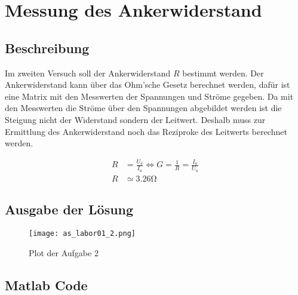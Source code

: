 \section{Messung des Ankerwiderstand}

\subsection{Beschreibung}

Im zweiten Versuch soll der Ankerwiderstand $R$ bestimmt werden.
Der Ankerwiderstand kann über das Ohm'sche Gesetz berechnet werden,
dafür ist eine Matrix mit den Messwerten der Spannungen und Ströme gegeben.
Da mit den Messwerten die Ströme über den Spannungen abgebildet werden ist die
Steigung nicht der Widerstand sondern der Leitwert. Deshalb muss zur Ermittlung
des Ankerwiderstand noch das Reziproke des Leitwerts berechnet werden.

\begin{equation} \label{eq121}
    \begin{split}
        R&=\frac{U_a}{I_a} \Leftrightarrow G=\frac{1}{R}=\frac{I_a}{U_a}\\
        R&\simeq 3.26 \mathrm{\Omega}
    \end{split}
\end{equation}

\subsection{Ausgabe der Lösung}
\begin{figure}[H]
 \centering
 \texttt{[image: as\_labor01\_2.png]}
 \caption{Plot der Aufgabe 2}
 \label{fig:PlotAufgabe2}
\end{figure}

\subsection{Matlab Code}

